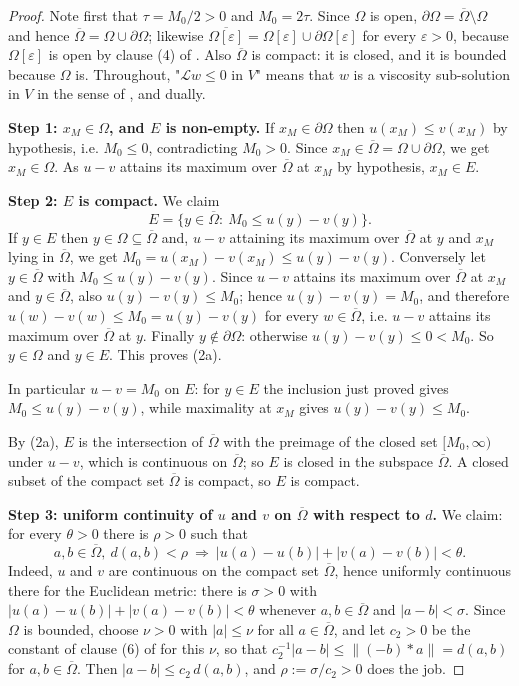 \begin{proof}
Note first that $\tau=M_0/2>0$ and $M_0=2\tau$. Since $\Omega$ is open,
$\partial\Omega=\overline\Omega\setminus\Omega$ and hence
$\overline\Omega=\Omega\cup\partial\Omega$; likewise
$\overline{\Omega[\varepsilon]}=\Omega[\varepsilon]\cup\partial\Omega[\varepsilon]$ for every
$\varepsilon>0$, because $\Omega[\varepsilon]$ is open by clause (4) of
. Also $\overline\Omega$ is compact: it is closed, and it is
bounded because $\Omega$ is. Throughout, "$\mathcal L w\le0$ in $V$" means that $w$ is a
viscosity sub-solution in $V$ in the sense of , and dually.

\medskip\noindent\textbf{Step 1: $x_M\in\Omega$, and $E$ is non-empty.} If
$x_M\in\partial\Omega$ then $u(x_M)\le v(x_M)$ by hypothesis, i.e. $M_0\le0$, contradicting
$M_0>0$. Since $x_M\in\overline\Omega=\Omega\cup\partial\Omega$, we get $x_M\in\Omega$. As
$u-v$ attains its maximum over $\overline\Omega$ at $x_M$ by hypothesis, $x_M\in E$.

\medskip\noindent\textbf{Step 2: $E$ is compact.} We claim
\[
 E=\big\{y\in\overline\Omega:\ M_0\le u(y)-v(y)\big\}. \tag{2a}
\]
If $y\in E$ then $y\in\Omega\subseteq\overline\Omega$ and, $u-v$ attaining its maximum over
$\overline\Omega$ at $y$ and $x_M$ lying in $\overline\Omega$, we get
$M_0=u(x_M)-v(x_M)\le u(y)-v(y)$. Conversely let $y\in\overline\Omega$ with
$M_0\le u(y)-v(y)$. Since $u-v$ attains its maximum over $\overline\Omega$ at $x_M$ and
$y\in\overline\Omega$, also $u(y)-v(y)\le M_0$; hence $u(y)-v(y)=M_0$, and therefore
$u(w)-v(w)\le M_0=u(y)-v(y)$ for every $w\in\overline\Omega$, i.e. $u-v$ attains its maximum
over $\overline\Omega$ at $y$. Finally $y\notin\partial\Omega$: otherwise
$u(y)-v(y)\le0<M_0$. So $y\in\Omega$ and $y\in E$. This proves (2a).

In particular $u-v=M_0$ on $E$: for $y\in E$ the inclusion just proved gives
$M_0\le u(y)-v(y)$, while maximality at $x_M$ gives $u(y)-v(y)\le M_0$.

By (2a), $E$ is the intersection of $\overline\Omega$ with the preimage of the closed set
$[M_0,\infty)$ under $u-v$, which is continuous on $\overline\Omega$; so $E$ is closed in
the subspace $\overline\Omega$. A closed subset of the compact set $\overline\Omega$ is
compact, so $E$ is compact.

\medskip\noindent\textbf{Step 3: uniform continuity of $u$ and $v$ on $\overline\Omega$
with respect to $d$.} We claim: for every $\theta>0$ there is $\rho>0$ such that
\[
 a,b\in\overline\Omega,\ d(a,b)<\rho\ \Longrightarrow\ |u(a)-u(b)|+|v(a)-v(b)|<\theta. \tag{3a}
\]
Indeed, $u$ and $v$ are continuous on the compact set $\overline\Omega$, hence uniformly
continuous there for the Euclidean metric: there is $\sigma>0$ with
$|u(a)-u(b)|+|v(a)-v(b)|<\theta$ whenever $a,b\in\overline\Omega$ and $|a-b|<\sigma$. Since
$\Omega$ is bounded, choose $\nu>0$ with $|a|\le\nu$ for all $a\in\overline\Omega$, and let
$c_2>0$ be the constant of clause (6) of  for this $\nu$, so that
$c_2^{-1}|a-b|\le\|(-b)*a\|=d(a,b)$ for $a,b\in\overline\Omega$. Then
$|a-b|\le c_2\,d(a,b)$, and $\rho:=\sigma/c_2>0$ does the job.


\end{proof}
